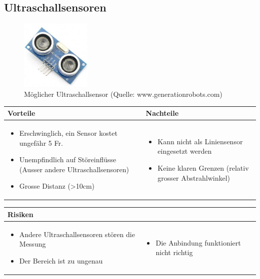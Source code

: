 \pagebreak


\subsection{Ultraschallsensoren}
\begin{figure}[h]
	\centering
	\includegraphics[width=0.3\textwidth]{fig/ultraschallsensor.png}
	\caption{Möglicher Ultraschallsensor (Quelle: www.generationrobots.com)}
\end{figure}

\begin{table}[h]
\begin{tabular}{p{} | p{}}


\textbf{Vorteile} & \textbf{Nachteile} \\ \hline
	 
\begin{itemize}
\item Erschwinglich, ein Sensor kostet ungefähr 5 Fr.
\item Unempfindlich auf Störeinflüsse (Ausser andere Ultraschallsensoren)
\item Grosse Distanz (>10cm)
\end{itemize}
 &
\begin{itemize}
\item Kann nicht als Liniensensor eingesetzt werden
\item Keine klaren Grenzen (relativ grosser Abstrahlwinkel)
\end{itemize}
\end{tabular}
\end{table}


\begin{table}[h]
\begin{tabular}{p{}p{}}


 \textbf{Risiken} & \\ \hline
	 
\begin{itemize}
\item Andere Ultraschallsensoren stören die Messung
\item Der Bereich ist zu ungenau
\end{itemize}
&
\begin{itemize}
\item Die Anbindung funktioniert nicht richtig
\end{itemize}

 
\end{tabular}
\end{table}

